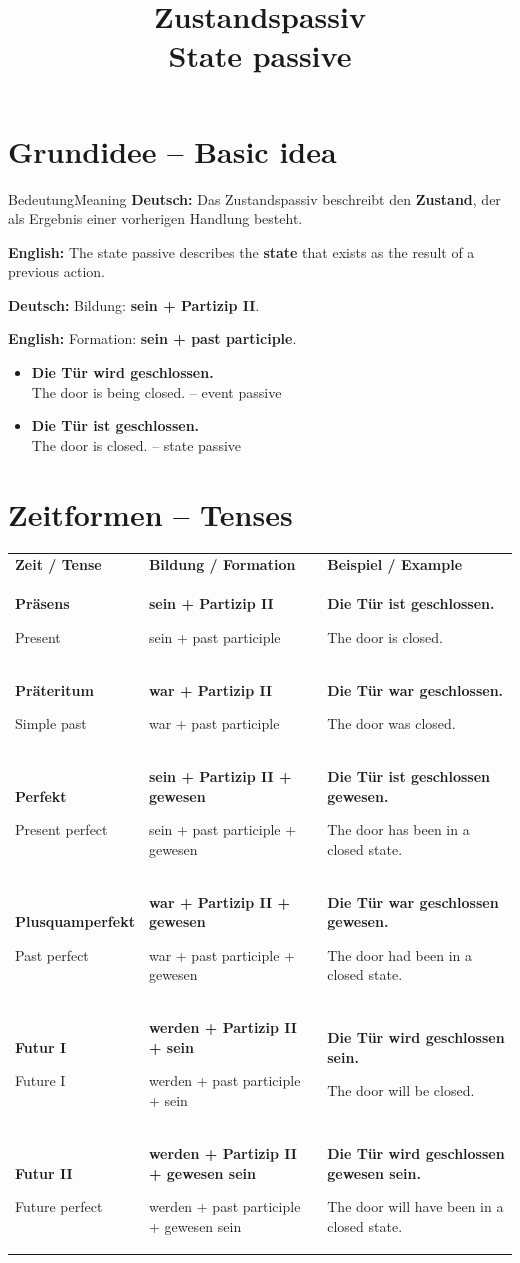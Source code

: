 \documentclass[a4paper,11pt]{article}
\title{Zustandspassiv\\[0.3em]\large\textnormal{State passive}}
\date{}
\newcommand{\GermanText}[1]{\textbf{Deutsch: }#1\par}
\newcommand{\EnglishText}[1]{{\small\color{SoftGray}\textbf{English: }#1\par}}
\newcommand{\ExampleItem}[2]{\item \textbf{#1}\\{\small\color{SoftGray}#2}}
\newcommand{\DEEN}[2]{\textbf{#1}\par{\footnotesize\color{SoftGray}#2}}
\begin{document}
\maketitle
\tableofcontents
\newpage

\section{Grundidee -- Basic idea}
\begin{grammarentry}{Bedeutung}{Meaning}
\GermanText{Das Zustandspassiv beschreibt den \textbf{Zustand}, der als Ergebnis einer vorherigen Handlung besteht.}
\EnglishText{The state passive describes the \textbf{state} that exists as the result of a previous action.}
\GermanText{Bildung: \textbf{sein + Partizip II}.}
\EnglishText{Formation: \textbf{sein + past participle}.}
\end{grammarentry}
\begin{exbox}\begin{itemize}
\ExampleItem{Die Tür wird geschlossen.}{The door is being closed. -- event passive}
\ExampleItem{Die Tür ist geschlossen.}{The door is closed. -- state passive}
\end{itemize}\end{exbox}

\section{Zeitformen -- Tenses}
\begin{longtable}{>{\bfseries}p{3.0cm}|p{5.2cm}|p{5.6cm}}
\rowcolor{HeaderBlueDark}\color{white}\textbf{Zeit / Tense}&\color{white}\textbf{Bildung / Formation}&\color{white}\textbf{Beispiel / Example}\\
\DEEN{Präsens}{Present}&\DEEN{sein + Partizip II}{sein + past participle}&\DEEN{Die Tür ist geschlossen.}{The door is closed.}\\
\DEEN{Präteritum}{Simple past}&\DEEN{war + Partizip II}{war + past participle}&\DEEN{Die Tür war geschlossen.}{The door was closed.}\\
\DEEN{Perfekt}{Present perfect}&\DEEN{sein + Partizip II + gewesen}{sein + past participle + gewesen}&\DEEN{Die Tür ist geschlossen gewesen.}{The door has been in a closed state.}\\
\DEEN{Plusquamperfekt}{Past perfect}&\DEEN{war + Partizip II + gewesen}{war + past participle + gewesen}&\DEEN{Die Tür war geschlossen gewesen.}{The door had been in a closed state.}\\
\DEEN{Futur I}{Future I}&\DEEN{werden + Partizip II + sein}{werden + past participle + sein}&\DEEN{Die Tür wird geschlossen sein.}{The door will be closed.}\\
\DEEN{Futur II}{Future perfect}&\DEEN{werden + Partizip II + gewesen sein}{werden + past participle + gewesen sein}&\DEEN{Die Tür wird geschlossen gewesen sein.}{The door will have been in a closed state.}\\
\end{longtable}
\end{document}

